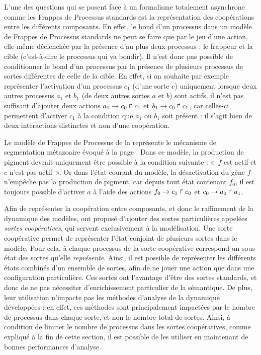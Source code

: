 L'une des questions qui se posent face à un formalisme totalement asynchrone comme
les Frappes de Processus standards est la représentation des coopérations entre les différents
composants.
En effet, le bond d'un processus dans un modèle de Frappes de Processus standards
ne peut se faire que par le jeu d'une action,
elle-même déclenchée par la présence d'au plus deux processus :
le frappeur et la cible (c'est-à-dire le processus qui va bondir).
Il n'est donc pas possible de conditionner le bond d'un processus par la présence
de plusieurs processus de sortes différentes de celle de la cible.
En effet,
si on souhaite par exemple représenter l'activation d'un processus $c_1$ (d'une sorte $c$)
uniquement lorsque deux autres processus $a_1$ et $b_1$ (de deux autres sortes $a$ et $b$)
sont actifs, il n'est pas suffisant d'ajouter deux actions
$a_1\rightarrow c_0\Rsh c_1$ et $b_1\rightarrow c_0\Rsh c_1$,
car celles-ci permettent d'activer $c_1$ à la condition que $a_1$ ou $b_1$
soit présent : il s'agit bien de deux interactions distinctes et non d'une coopération.

\begin{example}
  Le modèle de Frappes de Processus de la 
  représente le mécanisme de segmentation métazoaire évoqué à la page
  .
  Dans ce modèle, la production de pigment devrait uniquement être possible
  à la condition suivante : «~$f$ est actif et $c$ n'est pas actif~».
  Or dans l'état courant du modèle,
  la désactivation du gène $f$ n'empêche pas la production de pigment,
  car depuis tout état contenant $f_0$, il est toujours possible d'activer $a$
  à l'aide des actions $f_0\rightarrow c_1\Rsh c_0$ et $c_0\rightarrow a_0\Rsh a_1$.
\end{example}

Afin de représenter la coopération entre composants,
et donc le raffinement de la dynamique des modèles,
 ont proposé d'ajouter des sortes particulières appelées
\emph{sortes coopératives}, qui servent exclusivement à la modélisation.
Une sorte coopérative permet de représenter l'état conjoint de plusieurs sortes dans le modèle.
Pour cela, à chaque processus de la sorte coopérative correspond un sous-état des sortes
qu'elle \emph{représente}.
Ainsi, il est possible de représenter les différents états combinés d'un ensemble de sortes,
afin de ne jouer une action que dans une configuration particulière.
Ces sortes ont l'avantage d'être des sortes standards,
et donc de ne pas nécessiter d'enrichissement particulier de la sémantique.
De plus, leur utilisation n'impacte pas les méthodes d'analyse de la dynamique développées :
en effet, ces méthodes sont principalement impactées par le nombre de processus dans chaque sorte,
et non le nombre total de sortes.
Ainsi, à condition de limiter le nombre de processus dans les sortes coopératives,
comme expliqué à la fin de cette section,
il est possible de les utiliser en maintenant de bonnes performances d'analyse.


